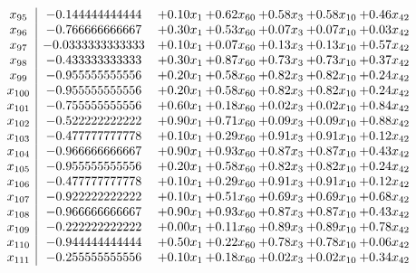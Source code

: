 \documentclass[8pt]{article}
\begin{document}
\[\begin{array}{c| c c@{\hskip 2pt} c@{\hskip 2pt} c@{\hskip 2pt} c@{\hskip 2pt} c@{\hskip 2pt} }
 x_{95}   &  -0.144444444444 & +  0.10 x_{1} & +  0.62 x_{60} & +  0.58 x_{3} & +  0.58 x_{10} & +  0.46 x_{42}\\
 x_{96}   &  -0.766666666667 & +  0.30 x_{1} & +  0.53 x_{60} & +  0.07 x_{3} & +  0.07 x_{10} & +  0.03 x_{42}\\
 x_{97}   &  -0.0333333333333 & +  0.10 x_{1} & +  0.07 x_{60} & +  0.13 x_{3} & +  0.13 x_{10} & +  0.57 x_{42}\\
 x_{98}   &  -0.433333333333 & +  0.30 x_{1} & +  0.87 x_{60} & +  0.73 x_{3} & +  0.73 x_{10} & +  0.37 x_{42}\\
 x_{99}   &  -0.955555555556 & +  0.20 x_{1} & +  0.58 x_{60} & +  0.82 x_{3} & +  0.82 x_{10} & +  0.24 x_{42}\\
 x_{100}   &  -0.955555555556 & +  0.20 x_{1} & +  0.58 x_{60} & +  0.82 x_{3} & +  0.82 x_{10} & +  0.24 x_{42}\\
 x_{101}   &  -0.755555555556 & +  0.60 x_{1} & +  0.18 x_{60} & +  0.02 x_{3} & +  0.02 x_{10} & +  0.84 x_{42}\\
 x_{102}   &  -0.522222222222 & +  0.90 x_{1} & +  0.71 x_{60} & +  0.09 x_{3} & +  0.09 x_{10} & +  0.88 x_{42}\\
 x_{103}   &  -0.477777777778 & +  0.10 x_{1} & +  0.29 x_{60} & +  0.91 x_{3} & +  0.91 x_{10} & +  0.12 x_{42}\\
 x_{104}   &  -0.966666666667 & +  0.90 x_{1} & +  0.93 x_{60} & +  0.87 x_{3} & +  0.87 x_{10} & +  0.43 x_{42}\\
 x_{105}   &  -0.955555555556 & +  0.20 x_{1} & +  0.58 x_{60} & +  0.82 x_{3} & +  0.82 x_{10} & +  0.24 x_{42}\\
 x_{106}   &  -0.477777777778 & +  0.10 x_{1} & +  0.29 x_{60} & +  0.91 x_{3} & +  0.91 x_{10} & +  0.12 x_{42}\\
 x_{107}   &  -0.922222222222 & +  0.10 x_{1} & +  0.51 x_{60} & +  0.69 x_{3} & +  0.69 x_{10} & +  0.68 x_{42}\\
 x_{108}   &  -0.966666666667 & +  0.90 x_{1} & +  0.93 x_{60} & +  0.87 x_{3} & +  0.87 x_{10} & +  0.43 x_{42}\\
 x_{109}   &  -0.222222222222 & +  0.00 x_{1} & +  0.11 x_{60} & +  0.89 x_{3} & +  0.89 x_{10} & +  0.78 x_{42}\\
 x_{110}   &  -0.944444444444 & +  0.50 x_{1} & +  0.22 x_{60} & +  0.78 x_{3} & +  0.78 x_{10} & +  0.06 x_{42}\\
 x_{111}   &  -0.255555555556 & +  0.10 x_{1} & +  0.18 x_{60} & +  0.02 x_{3} & +  0.02 x_{10} & +  0.34 x_{42}\\

\end{array}\]
\end{document}

